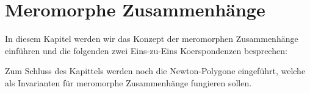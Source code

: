 \chapter{Meromorphe Zusammenhänge}

In diesem Kapitel werden wir das Konzept der meromorphen Zusammenhänge
einführen und die folgenden zwei Eins-zu-Eins Koerspondenzen besprechen:
\begin{center}
\end{center}
Zum Schluss des Kapittels werden noch die Newton-Polygone eingeführt, welche
als Invarianten für meromorphe Zusammenhänge fungieren sollen.

\begin{comment}
Sei $\cM$ ein $\cD$-Modul ungleich Null von endlichem Typ. Falls die
links-Multiplikation mit $x$ bijektiv ist, so nennen wir $\cM$ einen
meromorphen Zusammenhang. \cite[Chap 4]{sabbah_cimpa90}
\end{comment}

